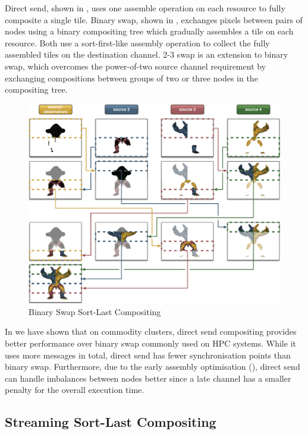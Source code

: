 Direct send, shown in , uses one assemble operation on each
resource to fully composite a single tile. Binary swap, shown in ,
exchanges pixels between pairs of nodes using a binary compositing tree which
gradually assembles a tile on each resource. Both use a sort-first-like
assembly operation to collect the fully assembled tiles on the destination
channel. 2-3 swap \cite{Yu:2008:MPV:1413370.1413419} is an extension to binary
swap, which overcomes the power-of-two source channel requirement by exchanging
compositions between groups of two or three nodes in the compositing tree.

\begin{figure}[h!t]\center
 \includegraphics[width=\columnwidth]{images/binarySwap}
 {\caption{\label{fBS}Binary Swap Sort-Last Compositing}}
\end{figure}

In \cite{EP:07} we have shown that on commodity clusters, direct send
compositing provides better performance over binary swap commonly used on HPC
systems. While it uses more messages in total, direct send has fewer
synchronisation points than binary swap. Furthermore, due to the early assembly
optimisation (), direct send can handle imbalances between
nodes better since a late channel has a smaller penalty for the overall
execution time.

\subsection{Streaming Sort-Last Compositing}


